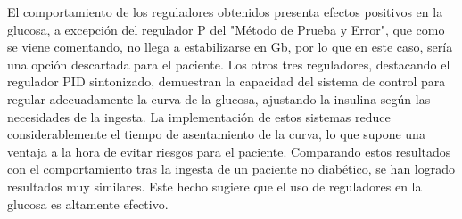 El comportamiento de los reguladores obtenidos presenta efectos positivos en la glucosa, a excepción del regulador P del "Método de Prueba y Error", que como se viene comentando, no llega a estabilizarse en Gb, por lo que en este caso, sería una opción descartada para el paciente. Los otros tres reguladores, destacando el regulador PID sintonizado, demuestran la capacidad del sistema de control para regular adecuadamente la curva de la glucosa, ajustando la insulina según las necesidades de la ingesta. La implementación de estos sistemas reduce considerablemente el tiempo de asentamiento de la curva, lo que supone una ventaja a la hora de evitar riesgos para el paciente. Comparando estos resultados con el comportamiento tras la ingesta de un paciente no diabético, se han logrado resultados muy similares. Este hecho sugiere que el uso de reguladores en la glucosa es altamente efectivo.